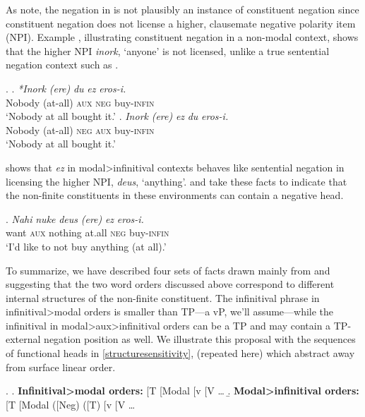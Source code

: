 \documentclass[output=paper]{langscibook}
\begin{document}
As \cite{etxepare-uribeetxebarria2009} note, the negation in \Last[b] is not plausibly an instance of constituent negation since constituent negation does not license a higher, clausemate negative polarity item (NPI).  Example \Next[a], illustrating constituent negation in a non-modal context, shows that the higher NPI \textit{inork}, `anyone' is not licensed, unlike a true sentential negation context such as \Next[b].  

\ex.	\ag.	\textit{*Inork} \textit{(ere)}     \textit{du}     \textit{ez}  \textit{eros-i.} \\
   	Nobody (at-all) \textsc{aux} \textsc{neg} buy-\textsc{infin} \\
       `Nobody at all bought it.' 
	\bg. 	\textit{Inork} \textit{(ere)}       \textit{ez}    \textit{du}   \textit{eros-i.}   \\
		Nobody (at-all) \textsc{neg} \textsc{aux} buy-\textsc{infin}  \\
   	`Nobody at all bought it.'


\Next shows that \textit{ez} in modal>infinitival contexts behaves like sentential negation in licensing the higher NPI, \textit{deus}, `anything'.  \cite{balza2010} and \cite{etxepare-uribeetxebarria2009} take these facts to indicate that the non-finite constituents in these environments can contain a negative head.

\exg.	\textit{Nahi}  \textit{nuke} \textit{deus} \textit{(ere)} \textit{ez} \textit{eros-i.}\\
want \textsc{aux}   nothing at.all \textsc{neg} buy-\textsc{infin} \\
	`I'd like to not buy anything (at all).'


To summarize, we have described four sets of facts drawn mainly from  \cite{etxepare-uribeetxebarria2009, etxepare-uribeetxebarria2012} and \cite{balza2010} suggesting that the two word orders discussed above correspond to different internal structures of the non-finite constituent. The infinitival phrase in infinitival>modal orders is smaller than TP---a vP, we'll assume---while the infinitival in modal>aux>infinitival orders can be a TP and may contain a TP-external negation position as well.  We illustrate this proposal with the sequences of functional heads in \protect\ref{structuresensitivity}, (repeated here) which abstract away from surface linear order.

\ex.	\protect\label{structuresensitivity} \a. \textbf{Infinitival>modal orders:} [T [Modal [v [V \ldots  
	\b. \textbf{Modal>infinitival orders:} [T [Modal ([Neg) ([T)  [v [V \ldots  \\
\end{document}
